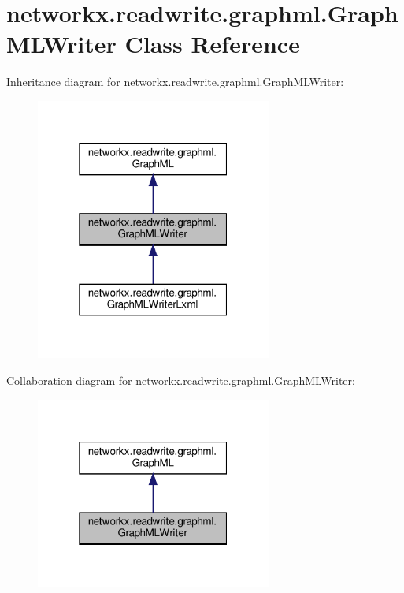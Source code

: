 \hypertarget{classnetworkx_1_1readwrite_1_1graphml_1_1GraphMLWriter}{}\section{networkx.\+readwrite.\+graphml.\+Graph\+M\+L\+Writer Class Reference}
\label{classnetworkx_1_1readwrite_1_1graphml_1_1GraphMLWriter}


Inheritance diagram for networkx.\+readwrite.\+graphml.\+Graph\+M\+L\+Writer\+:
\nopagebreak
\begin{figure}[H]
\begin{center}
\leavevmode
\includegraphics[width=220pt]{classnetworkx_1_1readwrite_1_1graphml_1_1GraphMLWriter__inherit__graph}
\end{center}
\end{figure}


Collaboration diagram for networkx.\+readwrite.\+graphml.\+Graph\+M\+L\+Writer\+:
\nopagebreak
\begin{figure}[H]
\begin{center}
\leavevmode
\includegraphics[width=220pt]{classnetworkx_1_1readwrite_1_1graphml_1_1GraphMLWriter__coll__graph}
\end{center}
\end{figure}
